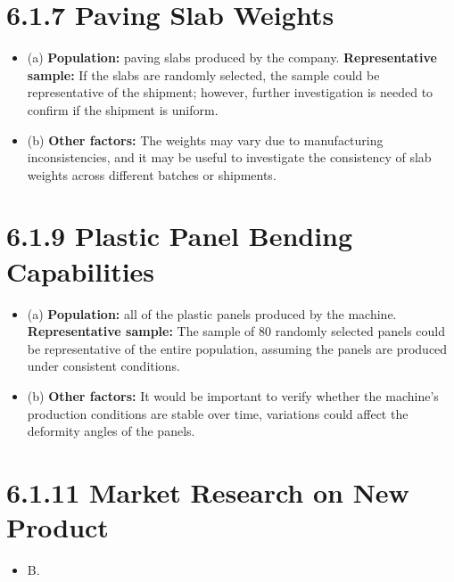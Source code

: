 \documentclass{article}
\begin{document}
\section*{6.1.7 Paving Slab Weights}
\begin{itemize}
    \item (a) \textbf{Population:} paving slabs produced by the company.
    \newline \textbf{Representative sample:} If the slabs are randomly selected, the sample could be representative of the shipment; however, further investigation is needed to confirm if the shipment is uniform.
    \item (b) \textbf{Other factors:} The weights may vary due to manufacturing inconsistencies, and it may be useful to investigate the consistency of slab weights across different batches or shipments.
\end{itemize}

\section*{6.1.9 Plastic Panel Bending Capabilities}
\begin{itemize}
    \item (a) \textbf{Population:} all of the plastic panels produced by the machine.
    \newline \textbf{Representative sample:} The sample of 80 randomly selected panels could be representative of the entire population, assuming the panels are produced under consistent conditions.
    \item (b) \textbf{Other factors:} It would be important to verify whether the machine's production conditions are stable over time, variations could affect the deformity angles of the panels.
\end{itemize}

\section*{6.1.11 Market Research on New Product}
\begin{itemize}
    \item B.
\end{itemize}
\end{document}
